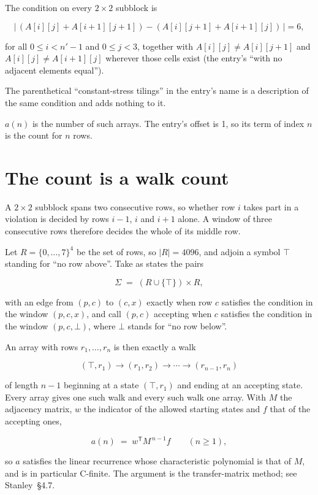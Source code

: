 \documentclass[11pt]{article}
\theoremstyle{definition}
\begin{document}
The condition on every $2 \times 2$ subblock is

\[\bigl|\,(A[i][j] + A[i{+}1][j{+}1]) - (A[i][j{+}1] + A[i{+}1][j])\,\bigr| = 6,\]

for all $0 \le i < n'-1$ and $0 \le j < 3$, together with $A[i][j] \ne A[i][j{+}1]$ and $A[i][j] \ne A[i{+}1][j]$ wherever those cells exist (the entry's ``with no adjacent elements equal'').

The parenthetical ``constant-stress tilings'' in the entry's name is a description of the same condition and adds nothing to it.

$a(n)$ is the number of such arrays. The entry's offset is 1, so its term of index $n$ is the count for $n$ rows.

\section{The count is a walk count}

A $2 \times 2$ subblock spans two consecutive rows, so whether row $i$ takes part in a violation is decided by rows $i-1$, $i$ and $i+1$ alone. A window of three consecutive rows therefore decides the whole of its middle row.

Let $R = \{0,\dots,7\}^{4}$ be the set of rows, so $|R| = 4096$, and adjoin a symbol $\top$ standing for ``no row above''. Take as states the pairs

\[\Sigma \;=\; (R \cup \{\top\}) \times R,\]

with an edge from $(p,c)$ to $(c,x)$ exactly when row $c$ satisfies the condition in the window $(p,c,x)$, and call $(p,c)$ accepting when $c$ satisfies the condition in the window $(p,c,\bot)$, where $\bot$ stands for ``no row below''.

An array with rows $r_1,\dots,r_n$ is then exactly a walk

\[(\top,r_1) \to (r_1,r_2) \to \cdots \to (r_{n-1},r_n)\]

of length $n-1$ beginning at a state $(\top,r_1)$ and ending at an accepting state. Every array gives one such walk and every such walk one array. With $M$ the adjacency matrix, $w$ the indicator of the allowed starting states and $f$ that of the accepting ones,

\[a(n) \;=\; w^{\mathsf T} M^{\,n-1} f \qquad (n \ge 1),\]

so $a$ satisfies the linear recurrence whose characteristic polynomial is that of $M$, and is in particular C-finite. The argument is the transfer-matrix method; see Stanley~\S4.7.
\end{document}
